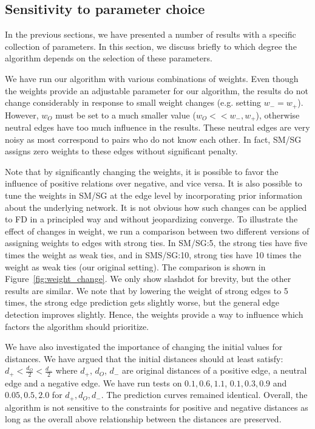 \documentclass[acmtweb]{acmsmall}
\begin{document}
\subsection{Sensitivity to parameter choice} \label{sec:sensitivity}
In the previous sections, we have presented a number of results with a
specific collection of parameters. In this section, we discuss briefly
to which degree the algorithm depends on the selection of these
parameters. 

We have run our algorithm with various combinations of weights. Even
though the weights provide an adjustable parameter for our algorithm,
the results do not change considerably in response to small weight
changes (e.g. setting $w_{-}=w_{+}$). However, $w_{O}$ must be set to
a much smaller value ($w_{O}<< w_{-}, w_{+}$), otherwise neutral edges
have too much influence in the results. These neutral edges are very
noisy as most correspond to pairs who do not know each other. In fact,
SM/SG assigns zero weights to these edges without significant
penalty. 

Note that by significantly changing the weights, it is possible to
favor the influence of positive relations over negative, and vice
versa.  It is also possible to tune the weights in SM/SG at the edge
level by incorporating prior information about the underlying
network. It is not obvious how such changes can be applied to FD in a
principled way and without jeopardizing converge. To illustrate the
effect of changes in weight, we run a comparison between two different
versions of assigning weights to edges with strong ties. In SM/SG:5,
the strong ties have five times the weight as weak ties, and in
SMS/SG:10, strong ties have 10 times the weight as weak ties (our
original setting). The comparison is shown in
Figure~\ref{fig:weight_change}. We only show slashdot for brevity, but
the other results are similar. We note that by lowering the weight of
strong edges to 5 times, the strong edge prediction gets slightly
worse, but the general edge detection improves slightly. Hence, the
weights provide a way to influence which factors the algorithm should
prioritize.

We have also investigated the importance of changing the initial
values for distances.  We have argued that the initial distances
should at least satisfy: $d_{+} < \frac{d_{O}}{2} < \frac{d_{-}}{2}$ where
$d_{+}$, $d_{O}$, $d_{-}$ are original distances of a positive edge, a
neutral edge and a negative edge. We have run tests on $0.1,0.6,1.1$,
$0.1,0.3,0.9$ and $0.05,0.5,2.0$ for $d_{+}, d_{O}, d_{-}$.  The
prediction curves remained identical. Overall, the algorithm is not
sensitive to the constraints for positive and negative distances as
long as the overall above relationship between the distances are
preserved.
\end{document}
